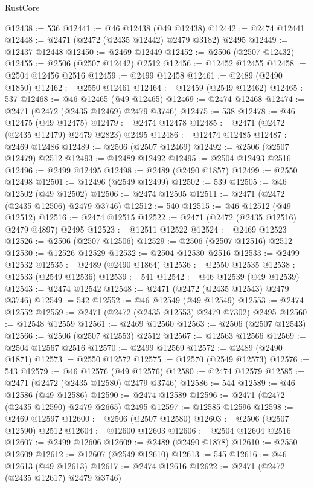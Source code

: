 \begin{lexlean}{RustCore}
\begin{coremodule}
@12438 := 536
@12441 := @46 @12438 (@49 @12438)
@12442 := @2474 @12441
@12448 := @2471 (@2472 (@2435 @12442) @2479 @3182) @2495
@12449 := @12437 @12448
@12450 := @2469 @12449
@12452 := @2506 (@2507 @12432)
@12455 := @2506 (@2507 @12442) @2512
@12456 := @12452 @12455
@12458 := @2504 @12456 @2516
@12459 := @2499 @12458
@12461 := @2489 (@2490 @1850)
@12462 := @2550 @12461
@12464 := @12459 (@2549 @12462)
@12465 := 537
@12468 := @46 @12465 (@49 @12465)
@12469 := @2474 @12468
@12474 := @2471 (@2472 (@2435 @12469) @2479 @3746)
@12475 := 538
@12478 := @46 @12475 (@49 @12475)
@12479 := @2474 @12478
@12485 := @2471 (@2472 (@2435 @12479) @2479 @2823) @2495
@12486 := @12474 @12485
@12487 := @2469 @12486
@12489 := @2506 (@2507 @12469)
@12492 := @2506 (@2507 @12479) @2512
@12493 := @12489 @12492
@12495 := @2504 @12493 @2516
@12496 := @2499 @12495
@12498 := @2489 (@2490 @1857)
@12499 := @2550 @12498
@12501 := @12496 (@2549 @12499)
@12502 := 539
@12505 := @46 @12502 (@49 @12502)
@12506 := @2474 @12505
@12511 := @2471 (@2472 (@2435 @12506) @2479 @3746)
@12512 := 540
@12515 := @46 @12512 (@49 @12512)
@12516 := @2474 @12515
@12522 := @2471 (@2472 (@2435 @12516) @2479 @4897) @2495
@12523 := @12511 @12522
@12524 := @2469 @12523
@12526 := @2506 (@2507 @12506)
@12529 := @2506 (@2507 @12516) @2512
@12530 := @12526 @12529
@12532 := @2504 @12530 @2516
@12533 := @2499 @12532
@12535 := @2489 (@2490 @1864)
@12536 := @2550 @12535
@12538 := @12533 (@2549 @12536)
@12539 := 541
@12542 := @46 @12539 (@49 @12539)
@12543 := @2474 @12542
@12548 := @2471 (@2472 (@2435 @12543) @2479 @3746)
@12549 := 542
@12552 := @46 @12549 (@49 @12549)
@12553 := @2474 @12552
@12559 := @2471 (@2472 (@2435 @12553) @2479 @7302) @2495
@12560 := @12548 @12559
@12561 := @2469 @12560
@12563 := @2506 (@2507 @12543)
@12566 := @2506 (@2507 @12553) @2512
@12567 := @12563 @12566
@12569 := @2504 @12567 @2516
@12570 := @2499 @12569
@12572 := @2489 (@2490 @1871)
@12573 := @2550 @12572
@12575 := @12570 (@2549 @12573)
@12576 := 543
@12579 := @46 @12576 (@49 @12576)
@12580 := @2474 @12579
@12585 := @2471 (@2472 (@2435 @12580) @2479 @3746)
@12586 := 544
@12589 := @46 @12586 (@49 @12586)
@12590 := @2474 @12589
@12596 := @2471 (@2472 (@2435 @12590) @2479 @2665) @2495
@12597 := @12585 @12596
@12598 := @2469 @12597
@12600 := @2506 (@2507 @12580)
@12603 := @2506 (@2507 @12590) @2512
@12604 := @12600 @12603
@12606 := @2504 @12604 @2516
@12607 := @2499 @12606
@12609 := @2489 (@2490 @1878)
@12610 := @2550 @12609
@12612 := @12607 (@2549 @12610)
@12613 := 545
@12616 := @46 @12613 (@49 @12613)
@12617 := @2474 @12616
@12622 := @2471 (@2472 (@2435 @12617) @2479 @3746)

\end{coremodule}
\end{lexlean}
